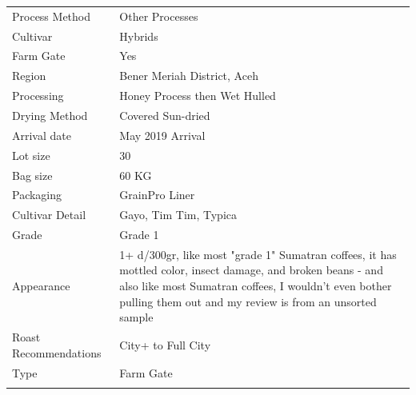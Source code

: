 \documentclass[10pt,twoside,footinclude=true,headinclude=true]{scrbook} %
\newlength{\mysize}
\newcommand{\myfontsize}[1]{
  \setlength{\mysize}{#1pt}
  \fontsize{\mysize}{1.2\mysize}
  \selectfont
}
\begin{document}
\vspace{1em}
\begin{table}[htbp]
\myfontsize{7}
\hspace*{2.2em}
\begin{tabular}{ >{\raggedleft\arraybackslash}p{3.6cm}!{\color{lightgray}\vrule}p{7cm} }
\hline
  Process Method & Other Processes \\
  \hline
  Cultivar & Hybrids \\
  \hline
  Farm Gate & Yes \\
  \hline
  Region & Bener Meriah District, Aceh \\
  \hline
  Processing & Honey Process then Wet Hulled \\
  \hline
  Drying Method & Covered Sun-dried \\
  \hline
  Arrival date & May 2019 Arrival \\
  \hline
  Lot size & 30 \\
  \hline
  Bag size & 60 KG \\
  \hline
  Packaging & GrainPro Liner \\
  \hline
  Cultivar Detail & Gayo, Tim Tim, Typica \\
  \hline
  Grade & Grade 1 \\
  \hline
  Appearance & 1+ d/300gr, like most "grade 1" Sumatran coffees, it has mottled color, insect damage, and broken beans - and also like most Sumatran coffees, I wouldn't even bother pulling them out and my review is from an unsorted sample \\
  \hline
  Roast Recommendations & City+ to Full City \\
  \hline
  Type & Farm Gate \\
  \hline

\end{tabular}
\end{table}

\end{document}
